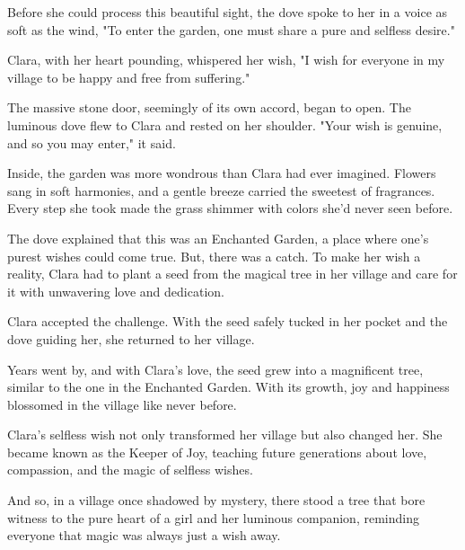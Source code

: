 \documentclass[10pt, a4paper, titlepage]{article}
\begin{document}
Before she could process this beautiful sight, the dove spoke to her in a voice as soft as the wind, "To enter the garden, one must share a pure and selfless desire."

Clara, with her heart pounding, whispered her wish, "I wish for everyone in my village to be happy and free from suffering."

The massive stone door, seemingly of its own accord, began to open. The luminous dove flew to Clara and rested on her shoulder. "Your wish is genuine, and so you may enter," it said.

Inside, the garden was more wondrous than Clara had ever imagined. Flowers sang in soft harmonies, and a gentle breeze carried the sweetest of fragrances. Every step she took made the grass shimmer with colors she'd never seen before.

The dove explained that this was an Enchanted Garden, a place where one’s purest wishes could come true. But, there was a catch. To make her wish a reality, Clara had to plant a seed from the magical tree in her village and care for it with unwavering love and dedication.

Clara accepted the challenge. With the seed safely tucked in her pocket and the dove guiding her, she returned to her village.

Years went by, and with Clara's love, the seed grew into a magnificent tree, similar to the one in the Enchanted Garden. With its growth, joy and happiness blossomed in the village like never before.

Clara's selfless wish not only transformed her village but also changed her. She became known as the Keeper of Joy, teaching future generations about love, compassion, and the magic of selfless wishes.

And so, in a village once shadowed by mystery, there stood a tree that bore witness to the pure heart of a girl and her luminous companion, reminding everyone that magic was always just a wish away.
\end{document}
